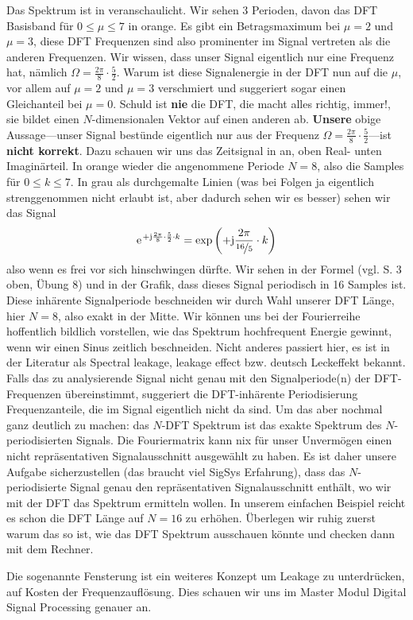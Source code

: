 \begin{Loesung}
%
%
Das Spektrum ist in  veranschaulicht. Wir sehen
3 Perioden, davon das DFT Basisband für $0\leq \mu \leq 7$ in orange.
Es gibt ein Betragsmaximum bei $\mu=2$ und $\mu=3$, diese DFT Frequenzen sind
also prominenter im Signal vertreten als die anderen Frequenzen.
%
Wir wissen, dass unser Signal eigentlich nur eine Frequenz hat, nämlich
$\Omega=\frac{2\pi}{8}\cdot\frac{5}{2}$.
Warum ist diese Signalenergie in der DFT nun auf die $\mu$, vor allem auf $\mu=2$ und
$\mu=3$  verschmiert und suggeriert sogar einen Gleichanteil bei $\mu=0$.
%
Schuld ist \textbf{nie} die DFT, die macht alles richtig, immer!, sie bildet
einen $N$-dimensionalen Vektor auf einen anderen ab.
%
\textbf{Unsere} obige Aussage---unser Signal bestünde eigentlich nur aus der Frequenz
$\Omega=\frac{2\pi}{8}\cdot\frac{5}{2}$---ist \textbf{nicht korrekt}.
Dazu schauen wir uns das Zeitsignal in  an, oben
Real- unten Imaginärteil. In orange wieder die angenommene Periode $N=8$, also
die Samples für $0 \leq k \leq 7$.
In grau als durchgemalte Linien (was bei Folgen ja eigentlich strenggenommen
nicht erlaubt ist, aber dadurch sehen wir es besser) sehen wir das Signal
\begin{align}
\e^{+\im \frac{2\pi}{8} \cdot \frac{5}{2} \cdot k} =
\exp\left(+\im \frac{2\pi}{\nicefrac{16}{5}} \cdot k\right)
\end{align}
also wenn es frei vor sich hinschwingen dürfte.
Wir sehen in der Formel (vgl. S. 3 oben, Übung 8) und in der Grafik, dass
dieses Signal periodisch in 16 Samples ist.
%
Diese inhärente Signalperiode beschneiden wir durch Wahl unserer DFT Länge,
hier $N=8$, also exakt in der Mitte.
%
Wir können uns bei der Fourierreihe hoffentlich bildlich vorstellen, wie das
Spektrum hochfrequent Energie gewinnt, wenn wir einen Sinus zeitlich beschneiden.
%
Nicht anderes passiert hier, es ist in der Literatur als Spectral leakage,
leakage effect bzw. deutsch Leckeffekt bekannt.
%
Falls das zu analysierende Signal nicht genau mit den Signalperiode(n)
der DFT-Frequenzen übereinstimmt, suggeriert die DFT-inhärente Periodisierung
Frequenzanteile, die im Signal eigentlich nicht da sind.
%
Um das aber nochmal ganz deutlich zu machen: das $N$-DFT Spektrum ist das exakte
Spektrum des $N$-periodisierten Signals.
Die Fouriermatrix kann nix für unser Unvermögen einen nicht repräsentativen
Signalausschnitt ausgewählt zu haben.
%
Es ist daher unsere Aufgabe sicherzustellen (das braucht viel SigSys Erfahrung),
dass das $N$-periodisierte Signal genau den repräsentativen Signalausschnitt
enthält, wo wir mit der DFT das Spektrum ermitteln wollen.
%
In unserem einfachen Beispiel reicht es schon die DFT Länge auf $N=16$ zu erhöhen.
%
Überlegen wir ruhig zuerst warum das so ist, wie das DFT Spektrum ausschauen könnte
und checken dann mit dem Rechner.
%

Die sogenannte Fensterung ist ein weiteres Konzept um Leakage zu unterdrücken,
auf Kosten der Frequenzauflösung. Dies schauen wir uns im Master Modul
Digital Signal Processing genauer an.
%
\end{Loesung}

